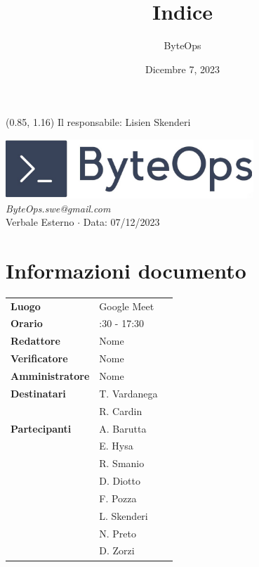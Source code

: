 \documentclass{article}
\title{\textbf{\fontsize{28}{6}\selectfont Indice}}
\author{\fontsize{14}{6}\selectfont ByteOps}
\date{Dicembre 7, 2023}
\begin{document}
\begin{textblock*}{\textwidth}(0.85\textwidth, 1.16\textheight)
    Il responsabile: Lisien Skenderi
\end{textblock*}

\pagestyle{fancy}
\begin{center}
\includegraphics[width = 0.7\textwidth]{../../../Images/logo.png} \\
\vspace{0.2cm}
\textcolor[RGB]{60, 60, 60}{\textit{ByteOps.swe@gmail.com}} \\
\vspace{1cm}
\fontsize{16}{6}\selectfont Verbale Esterno $\cdot$ Data: 07/12/2023 \\
\vspace{0.5cm}
\end{center}

\section*{Informazioni documento}
\def\arraystretch{1.2}
\begin{tabular}{>{\raggedleft\arraybackslash}p{}|>{\raggedright\arraybackslash}p{}c}
\hline
\addlinespace
\textbf{Luogo} & Google Meet \vspace{10pt} \\
\textbf{Orario} & 16:30 - 17:30 \vspace{10pt} \\
\textbf{Redattore} & Nome \vspace{10pt} \\
\textbf{Verificatore} & Nome \vspace{10pt} \\
\textbf{Amministratore} & Nome \vspace{10pt} \\
\textbf{Destinatari} & T. Vardanega \\ & R. Cardin \vspace{10pt} \\
\textbf{Partecipanti} & A. Barutta \\ & E. Hysa \\ & R. Smanio \\ & D. Diotto \\ & F. Pozza \\ & L. Skenderi \\ & N. Preto \\ & D. Zorzi \vspace{10pt}
\end{tabular}
\pagebreak 
\end{document}
